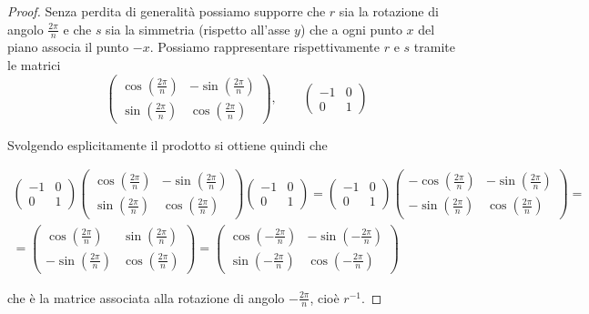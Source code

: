 \documentclass[11pt]{scrartcl}
\begin{document}
	\begin{proof}
		Senza perdita di generalità possiamo supporre che $r$ sia la rotazione 
		di angolo $\frac{2\pi}{n}$ e che $s$ sia la simmetria
		(rispetto all'asse $y$) che 
		a ogni punto $x$ del piano associa il punto $-x$. Possiamo rappresentare
		rispettivamente $r$ e $s$ tramite le matrici
		\begingroup
		\renewcommand{\arraystretch}{1.2}
		\[
		\begin{pmatrix}
			\cos\left(\frac{2\pi}{n}\right) & -\sin\left(\frac{2\pi}{n}\right)\\
			\sin\left(\frac{2\pi}{n}\right) & \cos\left(\frac{2\pi}{n}\right)
		\end{pmatrix}, \qquad
		\begin{pmatrix}
			-1 & 0\\
			0 & 1
		\end{pmatrix}
		\]
		\endgroup
		
		Svolgendo esplicitamente il prodotto si ottiene quindi che
		
		\begingroup
		\renewcommand{\arraystretch}{1.2}
		\begin{multline*}
			\begin{pmatrix}
				-1 & 0\\
				0 & 1
			\end{pmatrix}
			\begin{pmatrix}
				\cos\left(\frac{2\pi}{n}\right) & -\sin\left(\frac{2\pi}{n}\right)\\
				\sin\left(\frac{2\pi}{n}\right) & \cos\left(\frac{2\pi}{n}\right)
			\end{pmatrix}
			\begin{pmatrix}
				-1 & 0\\
				0 & 1
			\end{pmatrix} = 
			\begin{pmatrix}
				-1 & 0\\
				0 & 1
			\end{pmatrix}
			\begin{pmatrix}
				-\cos\left(\frac{2\pi}{n}\right) & -\sin\left(\frac{2\pi}{n}\right)\\
				-\sin\left(\frac{2\pi}{n}\right) & \cos\left(\frac{2\pi}{n}\right)
			\end{pmatrix} = \\ =
			\begin{pmatrix}
				\cos\left(\frac{2\pi}{n}\right) & \sin\left(\frac{2\pi}{n}\right)\\
				-\sin\left(\frac{2\pi}{n}\right) & \cos\left(\frac{2\pi}{n}\right)
			\end{pmatrix} = 
			\begin{pmatrix}
				\cos\left(-\frac{2\pi}{n}\right) & -\sin\left(-\frac{2\pi}{n}\right)\\
				\sin\left(-\frac{2\pi}{n}\right) & \cos\left(-\frac{2\pi}{n}\right)
			\end{pmatrix}
		\end{multline*}
		\endgroup
		
		che è la matrice associata alla rotazione di angolo $-
		\frac{2\pi}{n}$, cioè $r^{-1}$.
	\end{proof}
	
\end{document}

